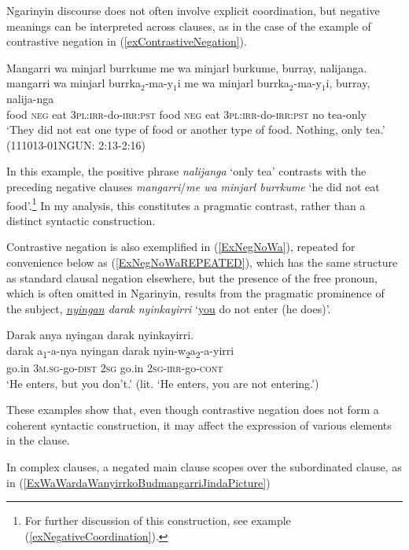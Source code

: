 \documentclass[output=paper,colorlinks,citecolor=brown]{langscibook}
\begin{document}
Ngarinyin discourse does not often involve explicit coordination, but negative meanings can be interpreted across clauses, as in the case of the example of contrastive negation in (\ref{exContrastiveNegation}).

\ea
\label{exContrastiveNegation}
    \glll Mangarri wa minjarl burrkume me wa minjarl burkume, burray, nalijanga.\\
    mangarri wa minjarl burrka$_2$-ma-y$_1$i me wa minjarl burrka$_2$-ma-y$_1$i, burray, nalija-nga\\
    food \textsc{neg} eat 3\textsc{pl:irr}-do-\textsc{irr:pst} food \textsc{neg} eat 3\textsc{pl:irr}-do-\textsc{irr:pst} no tea-only\\
    \trans `They did not eat one type of food or another type of food. Nothing, only tea.' (111013-01NGUN: 2:13-2:16)
\z

In this example, the positive phrase \textit{nalijanga} `only tea' contrasts with the preceding negative clauses \textit{mangarri}/\textit{me wa minjarl burrkume} `he did not eat food'.\footnote{For further discussion of this construction, see example (\ref{exNegativeCoordination}).} In my analysis, this constitutes a pragmatic contrast, rather than a distinct syntactic construction.

Contrastive negation is also exemplified in (\ref{ExNegNoWa}), repeated for convenience below as (\ref{ExNegNoWaREPEATED}), which has the same structure as standard clausal negation elsewhere, but the presence of the free pronoun, which is often omitted in Ngarinyin, results from the pragmatic prominence of the subject, \textit{\uline{nyingan} darak nyinkayirri} `\uline{you} do not enter (he does)'.


\ea \label{ExNegNoWaREPEATED}
    \glll Darak anya nyingan darak nyinkayirri.\\
    darak a\textsubscript{1}-a-nya nyingan darak nyin-w\textsubscript{2}a\textsubscript{2}-a-yirri\\
    go.in 3\textsc{m.sg}-go-\textsc{dist} 2\textsc{sg} go.in 2\textsc{sg}-\textsc{irr}-go-\textsc{cont}\\
    \trans `He enters, but you don't.' (lit. `He enters, you are not entering.') \citep[118, line 285]{Coate1966}
\z

These examples show that, even though contrastive negation does not form a coherent syntactic construction, it may affect the expression of various elements in the clause.

In complex clauses, a negated main clause scopes over the subordinated clause, as in (\ref{ExWaWardaWanyirrkoBudmangarriJindaPicture})
\end{document}
